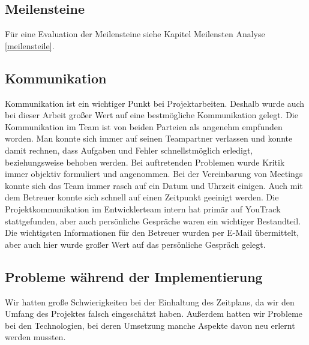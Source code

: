 \subsection{Meilensteine}
Für eine Evaluation der Meilensteine siehe Kapitel Meilensten Analyse \ref{meilensteile}.
\subsection{Kommunikation}

Kommunikation ist ein wichtiger Punkt bei Projektarbeiten. Deshalb wurde auch bei dieser Arbeit großer 
Wert auf eine bestmögliche Kommunikation gelegt. 
\newline
\newline
Die Kommunikation im Team ist von beiden Parteien als angenehm empfunden worden.
Man konnte sich immer auf seinen Teampartner verlassen und konnte damit rechnen, dass Aufgaben und Fehler 
schnellstmöglich erledigt, beziehungsweise behoben werden. Bei auftretenden Problemen wurde Kritik immer
objektiv formuliert und angenommen. 
Bei der Vereinbarung von Meetings konnte sich das Team immer rasch auf ein Datum und Uhrzeit einigen.
Auch mit dem Betreuer konnte sich schnell auf einen Zeitpunkt geeinigt werden.
Die Projektkommunikation im Entwicklerteam intern hat primär auf YouTrack stattgefunden, aber auch
persönliche Gespräche waren ein wichtiger Bestandteil. Die wichtigsten Informationen für den Betreuer
wurden per E-Mail übermittelt, aber auch hier wurde großer Wert auf das persönliche Gespräch gelegt.

\subsection{Probleme während der Implementierung}
Wir hatten große Schwierigkeiten bei der Einhaltung des Zeitplans, da wir den Umfang des Projektes falsch eingeschätzt haben.
Außerdem hatten wir Probleme bei den Technologien, bei deren Umsetzung manche Aspekte davon neu erlernt werden mussten.
